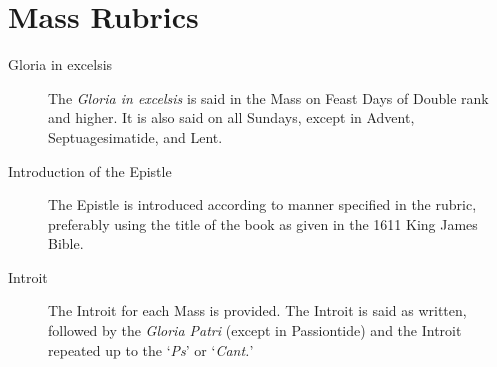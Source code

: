 \section*{Mass Rubrics}
\begin{description}
    \item[Gloria in excelsis] The \emph{Gloria in excelsis} is said in the Mass on Feast Days of Double rank and higher. It is also said on all Sundays, except in Advent, Septuagesimatide, and Lent.
    \item[Introduction of the Epistle] The Epistle is introduced according to manner specified in the rubric, preferably using the title of the book as given in the 1611 King James Bible.
    \item[Introit] The Introit for each Mass is provided. The Introit is said as written, followed by the \emph{Gloria Patri} (except in Passiontide) and the Introit repeated up to the `\emph{Ps}' or `\emph{Cant.}'

\end{description}
